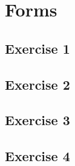 \chapter{Forms}

\section{Exercise 1}
\section{Exercise 2}
\section{Exercise 3}
\section{Exercise 4}

